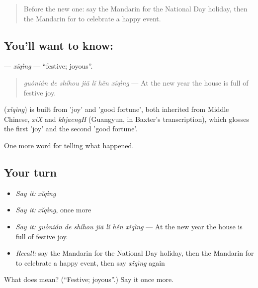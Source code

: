\label{lesson:ZH-C339-xiqing}



\begin{quote}
Before the new one: say the Mandarin for the National Day holiday, then the Mandarin for to celebrate a happy event.
\end{quote}

\subsection*{You'll want to know: }
\textbf{} — \emph{xǐqìng} — \textquotedblleft{}festive; joyous\textquotedblright{}.

\begin{quote}
\textbf{} \emph{guònián de shíhou jiā lǐ hěn xǐqìng} — At the new year the house is full of festive joy.
\end{quote}

\begin{cousinweb}
\textbf{} (\emph{xǐqìng}) is built from  'joy' and  'good fortune', both inherited from Middle Chinese, \emph{xiX} and \emph{khjaengH} (Guangyun, in Baxter's transcription), which glosses the first 'joy' and the second 'good fortune'.
\end{cousinweb}

\begin{grammarlens}[title={What you've built}]
One more word for telling what happened.
\end{grammarlens}

\subsection*{Your turn}
\begin{itemize}
\raggedright
  \item \emph{Say it:} \emph{xǐqìng}
  \item \emph{Say it:} \emph{xǐqìng}, once more
  \item \emph{Say it:} \emph{guònián de shíhou jiā lǐ hěn xǐqìng} — At the new year the house is full of festive joy.
  \item \emph{Recall:} say the Mandarin for the National Day holiday, then the Mandarin for to celebrate a happy event, then say \emph{xǐqìng} again
\end{itemize}

\begin{tcolorbox}[breakable,colback=teal!4,colframe=teal!35!black,title={Before you move on}]
What does  mean? (\textquotedblleft{}Festive; joyous\textquotedblright{}.) Say it once more.
\end{tcolorbox}
